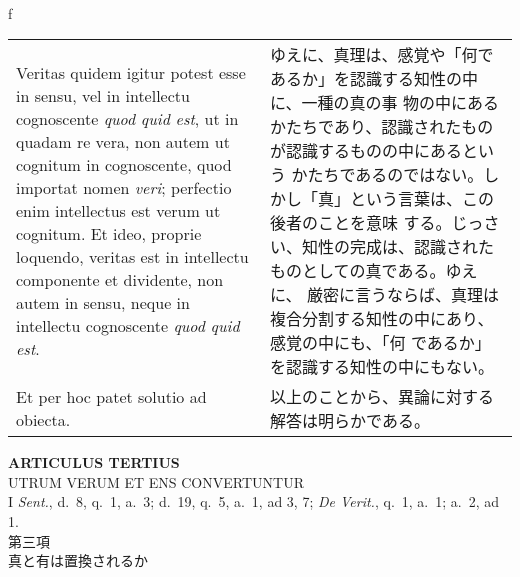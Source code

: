 \\f\documentclass[10pt]{jsarticle} %
\begin{document}
\begin{longtable}{p{21em}p{21em}}
\\

Veritas quidem igitur potest esse in sensu, vel in intellectu
cognoscente {\itshape quod quid est}, ut in quadam re vera, non autem
ut cognitum in cognoscente, quod importat nomen {\itshape veri};
perfectio enim intellectus est verum ut cognitum. Et ideo, proprie
loquendo, veritas est in intellectu componente et dividente, non autem
in sensu, neque in intellectu cognoscente {\itshape quod quid est}.

&

ゆえに、真理は、感覚や「何であるか」を認識する知性の中に、一種の真の事
物の中にあるかたちであり、認識されたものが認識するものの中にあるという
かたちであるのではない。しかし「真」という言葉は、この後者のことを意味
する。じっさい、知性の完成は、認識されたものとしての真である。ゆえに、
厳密に言うならば、真理は複合分割する知性の中にあり、感覚の中にも、「何
であるか」を認識する知性の中にもない。

\\

Et per hoc patet solutio ad obiecta.

&

以上のことから、異論に対する解答は明らかである。

\end{longtable}
\newpage

\begin{center}
 {\Large {\bf ARTICULUS TERTIUS}}\\
 {\large UTRUM VERUM ET ENS CONVERTUNTUR}\\
 {\footnotesize I {\itshape Sent.}, d.~8, q.~1, a.~3; d.~19, q.~5, a.~1,
 ad 3, 7; {\itshape De Verit.}, q.~1, a.~1; a.~2, ad 1.}\\
 {\Large 第三項\\真と有は置換されるか}
\end{center}
\end{document}
